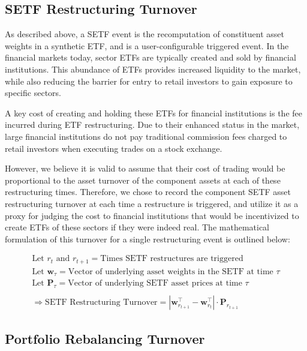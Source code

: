 \documentclass[../main.tex]{subfiles}
\begin{document}
\subsection{SETF Restructuring Turnover}

As described above, a SETF event is the recomputation of constituent asset weights in a synthetic ETF, and is a user-configurable triggered event. In the financial markets today, sector ETFs are typically created and sold by financial institutions. This abundance of ETFs provides increased liquidity to the market, while also reducing the barrier for entry to retail investors to gain exposure to specific sectors.

A key cost of creating and holding these ETFs for financial institutions is the fee incurred during ETF restructuring. Due to their enhanced status in the market, large financial institutions do not pay traditional commission fees charged to retail investors when executing trades on a stock exchange.

However, we believe it is valid to assume that their cost of trading would be proportional to the asset turnover of the component assets at each of these restructuring times. Therefore, we chose to record the component SETF asset restructuring turnover at each time a restructure is triggered, and utilize it as a proxy for judging the cost to financial institutions that would be incentivized to create ETFs of these sectors if they were indeed real. The mathematical formulation of this turnover for a single restructuring event is outlined below:

\begin{gather*}
    \text{Let $r_t$ and $r_{t+1}$} = \text{Times SETF restructures are triggered} \\
    \text{Let $\boldsymbol{w}_\tau$} = \text{Vector of underlying asset weights in the SETF at time $\tau$} \\
    \text{Let $\boldsymbol{P}_\tau$} = \text{Vector of underlying SETF asset prices at time $\tau$} \\
    \\
    \Rightarrow \text{SETF Restructuring Turnover} = \left| \boldsymbol{w}_{r_{t+1}}^\intercal - \boldsymbol{w}_{r_{t}}^\intercal \right| \cdot \boldsymbol{P}_{r_{t + 1}}
\end{gather*}

\subsection{Portfolio Rebalancing Turnover}
\end{document}
